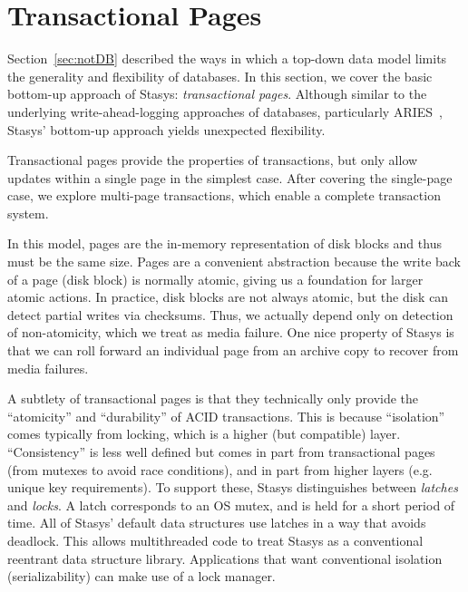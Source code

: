 \documentclass[letterpaper,twocolumn,10pt]{article}
\newcommand{\yad}{Stasys\xspace}
\newcommand{\yads}{Stasys'\xspace}
\begin{document}
\section{Transactional Pages}

Section~\ref{sec:notDB} described the ways in which a top-down data model
limits the generality and flexibility of databases.  In this section,
we cover the basic bottom-up approach of \yad: {\em transactional
pages}. Although similar to the underlying write-ahead-logging
approaches of databases, particularly ARIES~\cite{aries}, \yads
bottom-up approach yields unexpected flexibility.

Transactional pages provide the properties of transactions, but
only allow updates within a single page in the simplest case.  After
covering the single-page case, we explore multi-page transactions,
which enable a complete transaction system.

In this model, pages are the in-memory representation of disk blocks
and thus must be the same size.  Pages are a convenient abstraction
because the write back of a page (disk block) is normally atomic,
giving us a foundation for larger atomic actions. In practice, disk
blocks are not always atomic, but the disk can detect partial writes
via checksums.  Thus, we actually depend only on detection of
non-atomicity, which we treat as media failure.  One nice property of
\yad is that we can roll forward an individual page from an archive copy to
recover from media failures.

A subtlety of transactional pages is that they technically only
provide the ``atomicity'' and ``durability'' of ACID
transactions.  This is because ``isolation'' comes typically from locking, which
is a higher (but compatible) layer. ``Consistency'' is less well defined
but comes in part from transactional pages (from mutexes to avoid race
conditions), and in part from higher layers (e.g. unique key
requirements). To support these, \yad distinguishes between {\em
latches} and {\em locks}.  A latch corresponds to an OS mutex, and is
held for a short period of time.  All of \yads default data structures
use latches in a way that avoids deadlock. This allows
multithreaded code to treat \yad as a conventional reentrant data structure
library.  Applications that want conventional isolation
(serializability) can make use of a lock manager.
\end{document}
